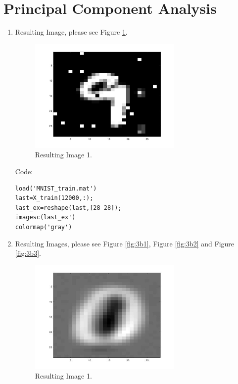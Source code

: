 \documentclass[english]{article}
\begin{document}
 \section{Principal Component Analysis}
 \begin{enumerate}
    \item Resulting Image, please see Figure \ref{fig:3a}.\\
    \begin{figure}[H]
          \centering
          \includegraphics[width=0.7\textwidth]{3a.jpg}
          \caption{Resulting Image 1.}
          \label{fig:3a}
        \end{figure}
        Code:
        \begin{verbatim}
load('MNIST_train.mat')
last=X_train(12000,:);
last_ex=reshape(last,[28 28]);
imagesc(last_ex')
colormap('gray')
        \end{verbatim}
        \clearpage
    \item Resulting Images, please see Figure \ref{fig:3b1}, Figure \ref{fig:3b2} and Figure \ref{fig:3b3}.
    \begin{figure}[H]
          \centering
          \includegraphics[width=0.7\textwidth]{3b1.jpg}
          \caption{Resulting Image 1.}

\end{figure}
\end{enumerate}
\end{document}
